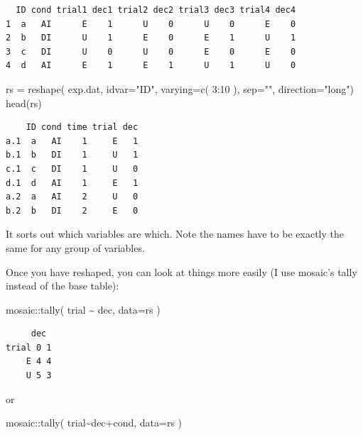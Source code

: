 \documentclass[
  letterpaper,
  DIV=11,
  numbers=noendperiod]{scrreprt}
\newenvironment{Shaded}{\begin{snugshade}}{\end{snugshade}}
\newcommand{\AttributeTok}[1]{\textcolor[rgb]{0.49,0.56,0.16}{#1}}
\newcommand{\DecValTok}[1]{\textcolor[rgb]{0.25,0.63,0.44}{#1}}
\newcommand{\FunctionTok}[1]{\textcolor[rgb]{0.02,0.16,0.49}{#1}}
\newcommand{\NormalTok}[1]{\textcolor[rgb]{0.00,0.44,0.13}{#1}}
\newcommand{\OtherTok}[1]{\textcolor[rgb]{0.00,0.44,0.13}{#1}}
\newcommand{\SpecialCharTok}[1]{\textcolor[rgb]{0.25,0.44,0.63}{#1}}
\newcommand{\StringTok}[1]{\textcolor[rgb]{0.25,0.44,0.63}{#1}}
\begin{document}
\begin{verbatim}
  ID cond trial1 dec1 trial2 dec2 trial3 dec3 trial4 dec4
1  a   AI      E    1      U    0      U    0      E    0
2  b   DI      U    1      E    0      E    1      U    1
3  c   DI      U    0      U    0      E    0      E    0
4  d   AI      E    1      E    1      U    1      U    0
\end{verbatim}

\begin{Shaded}
\begin{Highlighting}[]
\NormalTok{rs }\OtherTok{=} \FunctionTok{reshape}\NormalTok{( exp.dat,  }\AttributeTok{idvar=}\StringTok{"ID"}\NormalTok{, }
        \AttributeTok{varying=}\FunctionTok{c}\NormalTok{( }\DecValTok{3}\SpecialCharTok{:}\DecValTok{10}\NormalTok{ ), }\AttributeTok{sep=}\StringTok{""}\NormalTok{, }\AttributeTok{direction=}\StringTok{"long"}\NormalTok{)            }
\FunctionTok{head}\NormalTok{(rs)}
\end{Highlighting}
\end{Shaded}

\begin{verbatim}
    ID cond time trial dec
a.1  a   AI    1     E   1
b.1  b   DI    1     U   1
c.1  c   DI    1     U   0
d.1  d   AI    1     E   1
a.2  a   AI    2     U   0
b.2  b   DI    2     E   0
\end{verbatim}

It sorts out which variables are which. Note the names have to be
exactly the same for any group of variables.

Once you have reshaped, you can look at things more easily (I use
mosaic's tally instead of the base table):

\begin{Shaded}
\begin{Highlighting}[]
\NormalTok{mosaic}\SpecialCharTok{::}\FunctionTok{tally}\NormalTok{( trial }\SpecialCharTok{\textasciitilde{}}\NormalTok{ dec, }\AttributeTok{data=}\NormalTok{rs )}
\end{Highlighting}
\end{Shaded}

\begin{verbatim}
     dec
trial 0 1
    E 4 4
    U 5 3
\end{verbatim}

or

\begin{Shaded}
\begin{Highlighting}[]
\NormalTok{mosaic}\SpecialCharTok{::}\FunctionTok{tally}\NormalTok{( trial}\SpecialCharTok{\textasciitilde{}}\NormalTok{dec}\SpecialCharTok{+}\NormalTok{cond, }\AttributeTok{data=}\NormalTok{rs )}
\end{Highlighting}
\end{Shaded}
\end{document}
